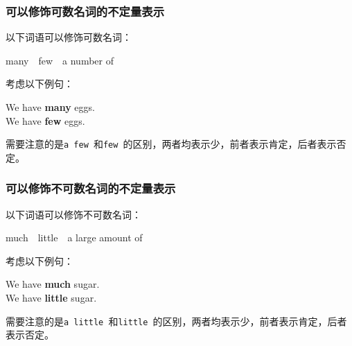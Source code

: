 \documentclass[UTF8]{ctexart}
\begin{document}
\subsubsection{可以修饰可数名词的不定量表示}
    以下词语可以修饰可数名词：
    \begin{center}
        \ttfamily
        many~~few~~a number of\\[6mm]
    \end{center}
    考虑以下例句：
    \begin{center}
        \large\ttfamily
        We have \textbf{many} eggs.\\[3mm]
        We have \textbf{few} eggs.\\[6mm]
    \end{center}
    需要注意的是\texttt{a few~}和\texttt{few~}的区别，两者均表示少，前者表示肯定，后者表示否定。

\subsubsection{可以修饰不可数名词的不定量表示}
    以下词语可以修饰不可数名词：
    \begin{center}
        \ttfamily
        much~~little~~a large amount of\\[6mm]
    \end{center}
    考虑以下例句：
    \begin{center}
        \large\ttfamily
        We have \textbf{much} sugar.\\[3mm]
        We have \textbf{little} sugar.\\[6mm]
    \end{center}
    需要注意的是\texttt{a little~}和\texttt{little~}的区别，两者均表示少，前者表示肯定，后者表示否定。

\newpage
\end{document}
